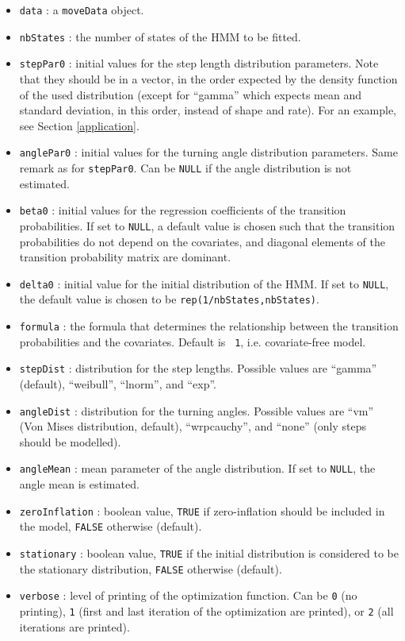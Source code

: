 \documentclass[]{article}
\begin{document}
\begin{itemize}
	\item \texttt{data} : a \texttt{moveData} object.
	\item \texttt{nbStates} : the number of states of the HMM to be fitted.
	\item \texttt{stepPar0} : initial values for the step length distribution parameters. Note that they should be in a vector, in the order expected by the density function of the used distribution (except for ``gamma'' which expects mean and standard deviation, in this order, instead of shape and rate). For an example, see Section \ref{application}.
	\item \texttt{anglePar0} : initial values for the turning angle distribution parameters. Same remark as for \texttt{stepPar0}. Can be \texttt{NULL} if the angle distribution is not estimated.
	\item \texttt{beta0} : initial values for the regression coefficients of the transition probabilities. If set to \texttt{NULL}, a default value is chosen such that the transition probabilities do not depend on the covariates, and diagonal elements of the transition probability matrix are dominant.
	\item \texttt{delta0} : initial value for the initial distribution of the HMM. If set to \texttt{NULL}, the default value is chosen to be \texttt{rep(1/nbStates,nbStates)}.
	\item \texttt{formula} : the formula that determines the relationship between the transition probabilities and the covariates. Default is \texttt{~1}, i.e. covariate-free model.
	\item \texttt{stepDist} : distribution for the step lengths. Possible values are ``gamma'' (default), ``weibull'', ``lnorm'', and ``exp''.
	\item \texttt{angleDist} : distribution for the turning angles. Possible values are ``vm'' (Von Mises distribution, default), ``wrpcauchy'', and ``none'' (only steps should be modelled).
	\item \texttt{angleMean} : mean parameter of the angle distribution. If set to \texttt{NULL}, the angle mean is estimated.
	\item \texttt{zeroInflation} : boolean value, \texttt{TRUE} if zero-inflation should be included in the model, \texttt{FALSE} otherwise (default).
	\item \texttt{stationary} : boolean value, \texttt{TRUE} if the initial distribution is considered to be the stationary distribution, \texttt{FALSE} otherwise (default).
	\item \texttt{verbose} : level of printing of the optimization function. Can be \texttt{0} (no printing), \texttt{1} (first and last iteration of the optimization are printed), or \texttt{2} (all iterations are printed).
\end{itemize}
\end{document}
